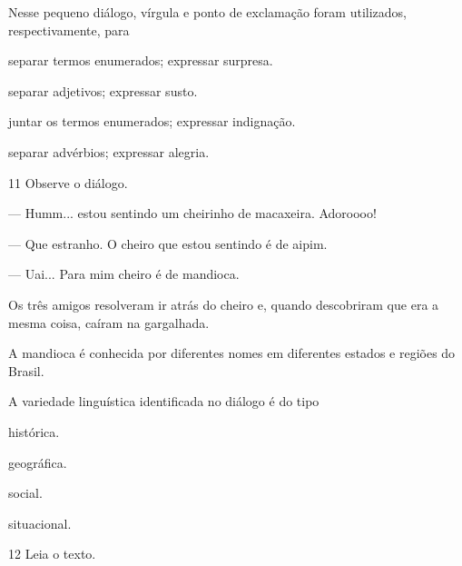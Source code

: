 Nesse pequeno diálogo, vírgula e ponto de exclamação foram utilizados,
respectivamente, para

\begin{escolha}
\item separar termos enumerados; expressar surpresa.

\item separar adjetivos; expressar susto.

\item juntar os termos enumerados; expressar indignação.

\item separar advérbios; expressar alegria.
\end{escolha}

\num{11} Observe o diálogo.

\begin{myquote}
--- Humm... estou sentindo um cheirinho de macaxeira. Adoroooo!

--- Que estranho. O cheiro que estou sentindo é de aipim.

--- Uai... Para mim cheiro é de mandioca.

Os três amigos resolveram ir atrás do cheiro e, quando descobriram que
era a mesma coisa, caíram na gargalhada.

\end{myquote}

A mandioca é conhecida por diferentes nomes em diferentes
estados e regiões do Brasil.

A variedade linguística identificada no diálogo é do tipo

\begin{escolha}
\item histórica.

\item geográfica.

\item social.

\item situacional.
\end{escolha}

\pagebreak
\num{12} Leia o texto.

